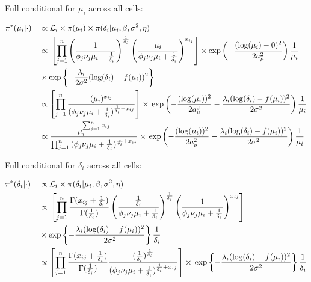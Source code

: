 Full conditional for $\mu_i$ across all cells:
\begin{fleqn}
\begin{align*}
&\pi^*(\mu_i|\cdot)&&\propto{} \mathcal{L}_i\times\pi(\mu_i)\times\pi(\delta_i|\mu_i,\beta,\sigma^2,\eta)\\
& &&\propto{}\left[\prod_{j=1}^n\left(\frac{1}{\phi_j\nu_j\mu_i+\frac{1}{\delta_i}}\right)^\frac{1}{\delta_i}\left(\frac{\mu_i}{\phi_j\nu_j\mu_i+\frac{1}{\delta_i}}\right)^{x_{ij}}\right]\times\exp\left(-\frac{(\log(\mu_i)-0)^2}{2a_\mu^2}\right)\frac{1}{\mu_i}\\
& &&\times\exp\left\lbrace-\frac{\lambda_i}{2\sigma^2}(\log(\delta_i)-f(\mu_i))^2\right\rbrace\\
& &&\propto\left[\prod_{j=1}^n{}\frac{(\mu_i)^{x_{ij}}}{(\phi_j\nu_j\mu_i+\frac{1}{\delta_i})^{\frac{1}{\delta_i}+x_{ij}}}\right]\times{}\exp\left(-\frac{(\log(\mu_i))^2}{2a_\mu^2}-\frac{\lambda_i(\log(\delta_i)-f(\mu_i))^2}{2\sigma^2}\right)\frac{1}{\mu_i}\\
& &&\propto{}\frac{\mu_i^{\sum_{j=1}^n{}x_{ij}}}{\prod_{j=1}^n{}(\phi_j\nu_j\mu_i+\frac{1}{\delta_i})^{\frac{1}{\delta_i}+x_{ij}}}\times{}\exp\left(-\frac{(\log(\mu_i))^2}{2a_\mu^2}-\frac{\lambda_i(\log(\delta_i)-f(\mu_i))^2}{2\sigma^2}\right)\frac{1}{\mu_i}
\end{align*}
\end{fleqn}

Full conditional for $\delta_i$ across all cells:
\begin{fleqn}
\begin{align*}
&\pi^*(\delta_i|\cdot)&&\propto{} \mathcal{L}_i\times\pi(\delta_i|\mu_i,\beta,\sigma^2,\eta)\\
& &&\propto{}\left[\prod_{j=1}^n\frac{\Gamma(x_{ij}+\frac{1}{\delta_i})}{\Gamma(\frac{1}{\delta_i})}\left(\frac{\frac{1}{\delta_i}}{\phi_j\nu_j\mu_i+\frac{1}{\delta_i}}\right)^\frac{1}{\delta_i}\left(\frac{1}{\phi_j\nu_j\mu_i+\frac{1}{\delta_i}}\right)^{x_{ij}}\right]\\
& &&\times\exp\left\lbrace-\frac{\lambda_i(\log(\delta_i)-f(\mu_i))^2}{2\sigma^2}\right\rbrace\frac{1}{\delta_i}\\
& &&\propto\left[\prod_{j=1}^n\frac{\Gamma(x_{ij}+\frac{1}{\delta_i})}{\Gamma(\frac{1}{\delta_i})}\frac{(\frac{1}{\delta_i})^{\frac{1}{\delta_i}}}{(\phi_j\nu_j\mu_i+\frac{1}{\delta_i})^{\frac{1}{\delta_i}+x_{ij}}}\right]\times{}\exp\left\lbrace-\frac{\lambda_i(\log(\delta_i)-f(\mu_i))^2}{2\sigma^2}\right\rbrace\frac{1}{\delta_i}\\
\end{align*}
\end{fleqn}

